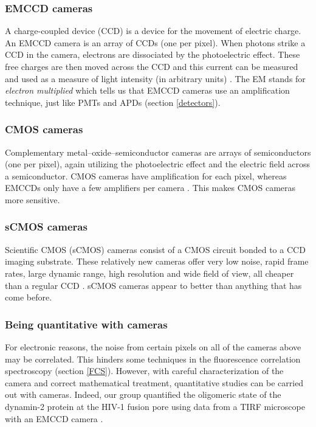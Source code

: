 \documentclass[12pt,]{book}
\theoremstyle{definition}
\theoremstyle{definition}
\theoremstyle{definition}
\theoremstyle{remark}
\begin{document}
\subsubsection{EMCCD cameras}\label{emccd-cameras}

A charge-coupled device (CCD) is a device for the movement of electric
charge. An EMCCD camera is an array of CCDs (one per pixel). When
photons strike a CCD in the camera, electrons are dissociated by the
photoelectric effect. These free charges are then moved across the CCD
and this current can be measured and used as a measure of light
intensity (in arbitrary units) \citep{EMCCD}. The EM stands for
\emph{electron multiplied} which tells us that EMCCD cameras use an
amplification technique, just like PMTs and APDs (section
\ref{detectors}).

\subsubsection{CMOS cameras}\label{cmos-cameras}

Complementary metal--oxide--semiconductor cameras are arrays of
semiconductors (one per pixel), again utilizing the photoelectric effect
and the electric field across a semiconductor. CMOS cameras have
amplification for each pixel, whereas EMCCDs only have a few amplifiers
per camera \citep{CMOS}. This makes CMOS cameras more sensitive.

\subsubsection{sCMOS cameras}\label{scmos-cameras}

Scientific CMOS (sCMOS) cameras consist of a CMOS circuit bonded to a
CCD imaging substrate. These relatively new cameras offer very low
noise, rapid frame rates, large dynamic range, high resolution and wide
field of view, all cheaper than a regular CCD \citep{sCMOS}. sCMOS
cameras appear to better than anything that has come before.

\subsubsection{Being quantitative with
cameras}\label{being-quantitative-with-cameras}

For electronic reasons, the noise from certain pixels on all of the
cameras above may be correlated. This hinders some techniques in the
fluorescence correlation spectroscopy (section \ref{FCS}). However, with
careful characterization of the camera and correct mathematical
treatment, quantitative studies can be carried out with cameras. Indeed,
our group quantified the oligomeric state of the dynamin-2 protein at
the HIV-1 fusion pore using data from a TIRF microscope with an EMCCD
camera \citep{DanDynamin}.
\end{document}
